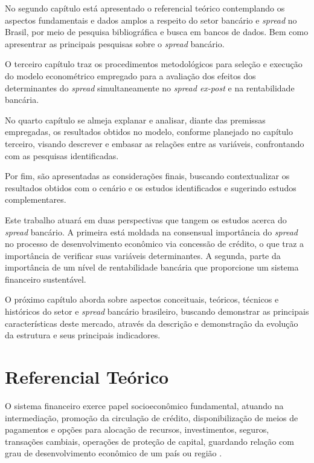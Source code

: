 \documentclass[
  12pt,
  12pt,
  openright,
  oneside,
  a4paper,
  chapter=TITLE,
  section=TITLE,
  subsection=TITLE,
  subsubsection=TITLE,
  portugues,
  sumario=tradicional]{abntex2}
\begin{document}
No segundo capítulo está apresentado o referencial teórico contemplando os aspectos fundamentais e dados amplos a respeito do setor bancário e \emph{spread} no Brasil, por meio de pesquisa bibliográfica e busca em bancos de dados. Bem como apresentrar as principais pesquisas sobre o \emph{spread} bancário.

O terceiro capítulo traz os procedimentos metodológicos para seleção e execução do modelo econométrico empregado para a avaliação dos efeitos dos determinantes do \emph{spread} simultaneamente no \emph{spread ex-post} e na rentabilidade bancária.

No quarto capítulo se almeja explanar e analisar, diante das premissas empregadas, os resultados obtidos no modelo, conforme planejado no capítulo terceiro, visando descrever e embasar as relações entre as variáveis, confrontando com as pesquisas identificadas.

Por fim, são apresentadas as considerações finais, buscando contextualizar os resultados obtidos com o cenário e os estudos identificados e sugerindo estudos complementares.

Este trabalho atuará em duas perspectivas que tangem os estudos acerca do \emph{spread} bancário. A primeira está moldada na consensual importância do \emph{spread} no processo de desenvolvimento econômico via concessão de crédito, o que traz a importância de verificar suas variáveis determinantes. A segunda, parte da importância de um nível de rentabilidade bancária que proporcione um sistema financeiro sustentável.

O próximo capítulo aborda sobre aspectos conceituais, teóricos, técnicos e históricos do setor e \emph{spread} bancário brasileiro, buscando demonstrar as principais características deste mercado, através da descrição e demonstração da evolução da estrutura e seus principais indicadores.

\textual
\pagestyle{simple}

\parindent 1.50cm

\chapter{Referencial Teórico}

O sistema financeiro exerce papel socioeconômico fundamental, atuando na intermediação, promoção da circulação de crédito, disponibilização de meios de pagamentos e opções para alocação de recursos, investimentos, seguros, transações cambiais, operações de proteção de capital, guardando relação com grau de desenvolvimento econômico de um país ou região \cite{maffili:2009}.
\end{document}
